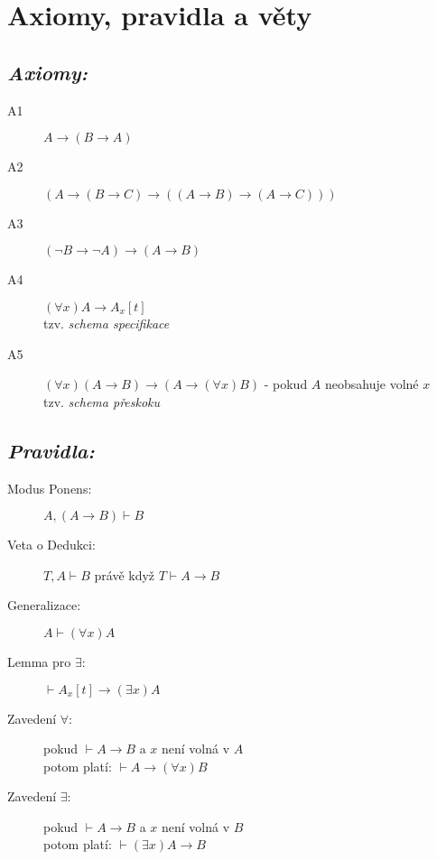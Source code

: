 \documentclass[a4paper]{article}      %
\begin{document}
\section*{Axiomy, pravidla a věty}

\subsection*{\textsl{Axiomy:}}
\begin{description}
	\item[A1]$ A \rightarrow (B\rightarrow A)$
	\item[A2]$ (A\rightarrow (B \rightarrow C)\rightarrow((A\rightarrow B)\rightarrow (A\rightarrow C)))$
	\item[A3]$ (\neg B\rightarrow \neg A)\rightarrow(A\rightarrow B)$
	\item[A4]$ (\forall x)A \rightarrow A_{x}[t]$ \\ tzv. \emph{schema specifikace}
	\item[A5]$ (\forall x)(A \rightarrow B)\rightarrow(A\rightarrow (\forall x)B)$ - pokud $A$ neobsahuje volné $x$\\
	tzv. \emph{schema přeskoku} 
\end{description}

\subsection*{\textsl{Pravidla:}}
\begin{description}
	\item[Modus Ponens:] $A,(A \rightarrow B) \vdash B$
	\item[Veta o Dedukci:] $T,A \vdash B$ právě když $T \vdash A \rightarrow B$
	\item[Generalizace:] $A \vdash (\forall x) A$
	\item[Lemma pro $\exists$:] $\vdash A_{x}[t] \rightarrow (\exists x) A$
	\item[Zavedení $\forall$:] pokud $\vdash A \rightarrow B$ a $x$ není volná v $A$\\ 
	potom platí: $\vdash A \rightarrow (\forall x) B$
	\item[Zavedení $\exists$:] pokud $\vdash A \rightarrow B$ a $x$ není volná v $B$\\ 
	potom platí: $\vdash (\exists x) A \rightarrow B$ 
\end{description}
\end{document}
